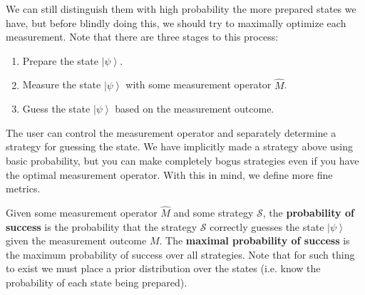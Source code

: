 \documentclass{article}
\newcommand{\ket}[1]{\ensuremath{\left|#1\right\rangle}}
\newcounter{definition}[section]
\begin{document}
    We can still distinguish them with high probability the more prepared states we have, but before blindly doing this, we should try to maximally optimize each measurement. Note that there are three stages to this process: 
    \begin{enumerate}
      \item Prepare the state $\ket{\psi}$. 
      \item Measure the state $\ket{\psi}$ with some measurement operator $\hat{M}$. 
      \item Guess the state $\ket{\psi}$ based on the measurement outcome. 
    \end{enumerate}
    The user can control the measurement operator and separately determine a strategy for guessing the state. We have implicitly made a strategy above using basic probability, but you can make completely bogus strategies even if you have the optimal measurement operator. With this in mind, we define more fine metrics. 

    \begin{definition}
      \label{def:maximal-probability-of-success}
      Given some measurement operator $\hat{M}$ and some strategy $\mathcal{S}$, the \textbf{probability of success} is the probability that the strategy $\mathcal{S}$ correctly guesses the state $\ket{\psi}$ given the measurement outcome $M$. The \textbf{maximal probability of success} is the maximum probability of success over all strategies. Note that for such thing to exist we must place a prior distribution over the states (i.e. know the probability of each state being prepared). 
    \end{definition}
\end{document}
